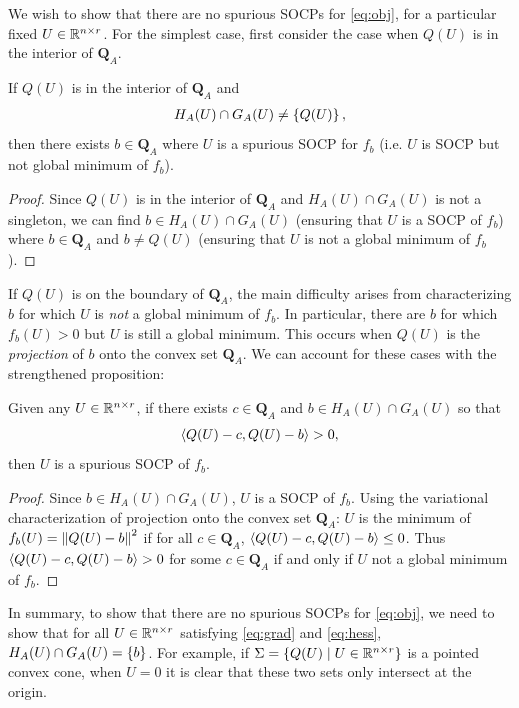 \documentclass[11pt]{article}
\newcommand{\APsd}{\mathbf{Q}_A}
\begin{document}
We wish to show that there are no spurious SOCPs for \eqref{eq:obj}, for a
particular fixed $U \in \mathbb{R}^{n\times r}$. For the simplest case, first consider
the case when $Q(U)$ is in the interior of $\APsd$.
\begin{proposition}
  If $Q(U)$ is in the interior of $\APsd$ and
  \begin{align*}
    H_A(U) \cap G_A(U) \ne \left\{ Q(U) \right\},
  \end{align*}
  then there exists $b \in \APsd$ where $U$ is a spurious SOCP for $f_b$
  (i.e. $U$ is SOCP but not global minimum of $f_b$).
  \begin{proof}
    Since $Q(U)$ is in the interior of $\APsd$ and $H_A(U) \cap G_A(U)$ is not a
    singleton, we can find $b \in H_A(U) \cap G_A(U)$ (ensuring that $U$ is a
    SOCP of $f_b$) where $b \in \APsd$ and $b \ne Q(U)$ (ensuring that $U$ is
    not a global minimum of $f_b$).
  \end{proof}
\end{proposition}

If $Q(U)$ is on the boundary of $\APsd$, the main difficulty arises from
characterizing $b$ for which $U$ is \emph{not} a global minimum of $f_b$. In
particular, there are $b$ for which $f_b(U) > 0$ but $U$ is still a global
minimum. This occurs when $Q(U)$ is the \emph{projection} of $b$ onto the convex
set $\APsd$. We can account for these cases with the strengthened proposition:
\begin{proposition}
  Given any $U \in \mathbb{R}^{n \times r}$, if there exists $c \in \APsd$ and
  $b \in H_A(U) \cap G_A(U)$ so that
  \begin{align*}
    \left\langle Q(U) - c, Q(U) - b \right\rangle > 0,
  \end{align*}
  then $U$ is a spurious SOCP of $f_b$.
  \begin{proof}
    Since $b \in H_A(U) \cap G_A(U)$, $U$ is a SOCP of $f_b$. Using the
    variational characterization of projection onto the convex set $\APsd$: $U$
    is the minimum of $f_b(U) = \left\lVert Q(U) - b \right\lVert^2$ if for all $c \in \APsd$,
    $\left\langle Q(U) - c, Q(U) - b \right\rangle \le 0$. Thus $\left\langle Q(U) - c, Q(U) - b \right\rangle > 0 $ for
    some $c \in \APsd$ if and only if $U$ not a global minimum of $f_b$.
  \end{proof}
\end{proposition}

In summary, to show that there are no spurious SOCPs for \eqref{eq:obj}, we need
to show that for all $U \in \mathbb{R}^{n \times r}$ satisfying \eqref{eq:grad} and
\eqref{eq:hess}, $H_A(U) \cap G_A(U) = \left\{ b \right\}$.  For example, if
$\Sigma = \left\{ Q(U) \mid U \in \mathbb{R}^{n \times r} \right\}$ is a pointed convex cone,
when $U = 0$ it is clear that these two sets only intersect at the origin.
\end{document}
